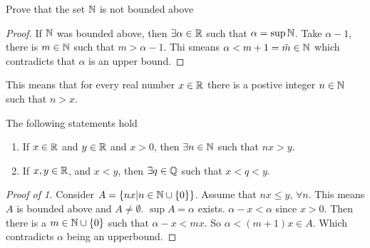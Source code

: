 \begin{proposition}
	Prove that the set \( \mathbb{N} \) is not bounded above
	\label{prop:naturalbounded}
\end{proposition}

\begin{proof}
	If \( \mathbb{N} \) was bounded above, then \(\exists \alpha \in \mathbb{R} \) such that 
	\( \alpha = \sup \mathbb{N} \). 
	Take \( \alpha - 1 \), there is \( m \in \mathbb{N} \) such that \( m > \alpha -1 \).
	Thi smeans \( \alpha < m + 1 = \tilde{m} \in \mathbb{N} \) which contradicts that 
	\( \alpha \) is an upper bound. 
\end{proof}

This means that for every real number \( x \in \mathbb{R} \) there is a postive integer \( n \in \mathbb{N} \)
such that \( n > x \). 

\begin{theorem}
	The following statements hold
	\begin{enumerate}
		\item If \( x \in \mathbb{R} \) and \( y \in \mathbb{R} \) and \( x > 0 \), then \( \exists n \in \mathbb{N} \)
			such that \( nx > y \). 
		\item If \( x,y \in \mathbb{R} \), and \( x < y \), then \( \exists q \in \mathbb{Q} \) such that
			\( x < q < y \). 
	\end{enumerate}
	\label{thm:Archimedian Property of Real Numbers}
\end{theorem}

\begin{proof}[Proof of 1]
	Consider \( A = \left\{ nx | n \in \mathbb{N} \cup \left\{ 0 \right\} \right\} \). 
	Assume that \( nx \le y \), \( \forall n \). 
	This means \( A \) is bounded above and \( A \not = \emptyset \). 
	\( \sup A = \alpha \) exists. \( \alpha - x < \alpha \) since \( x > 0 \). 
	Then there is a \( m \in \mathbb{N} \cup \left\{ 0 \right\} \) such that 
	\( \alpha - x < mx \). So \( \alpha < (m+1)x \in A \). 
	Which contradicts \( \alpha \) being an upperbound. 
\end{proof}

